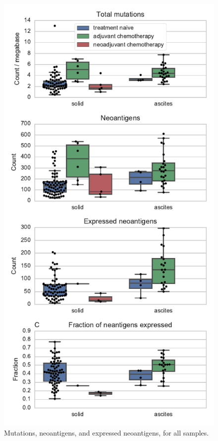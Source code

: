 \begin{figure}
\centering
\includegraphics[scale=1.0]{figures/counts.pdf}
\caption{Mutations, neoantigens, and expressed neoantigens, for all samples.}
\label{fig:counts}
\end{figure}

